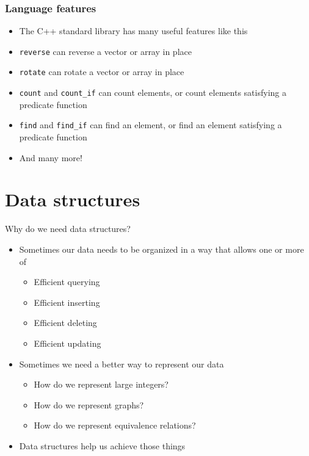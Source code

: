 \documentclass{beamer}
\begin{document}
\begin{frame}[plain]
    \frametitle{Language features}
    \begin{itemize}
        \item The C++ standard library has many useful features like this
        \item \texttt{reverse} can reverse a vector or array in place
        \item \texttt{rotate} can rotate a vector or array in place
        \item \texttt{count} and \texttt{count\_if} can count elements, or count elements satisfying a predicate function
        \item \texttt{find} and \texttt{find\_if} can find an element, or find an element satisfying a predicate function
        \item And many more!
    \end{itemize}
\end{frame}

\section*{Data structures}

\begin{frame}[plain]{Why do we need data structures?}
    \begin{itemize}
        \item Sometimes our data needs to be organized in a way that allows one or more of
            \begin{itemize}
                \item Efficient querying
                \item Efficient inserting
                \item Efficient deleting
                \item Efficient updating
            \end{itemize}
        \item Sometimes we need a better way to represent our data
            \begin{itemize}
                \item How do we represent large integers?
                \item How do we represent graphs?
                \item How do we represent equivalence relations?
            \end{itemize}

        \item Data structures help us achieve those things
    \end{itemize}
\end{frame}
\end{document}
